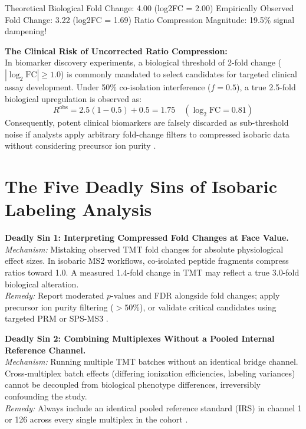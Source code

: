 \documentclass[11pt,oneside]{book}
\begin{document}
\begin{routput}
Theoretical Biological Fold Change: 4.00 (log2FC = 2.00)
Empirically Observed Fold Change:   3.22 (log2FC = 1.69)
Ratio Compression Magnitude:       19.5\% signal dampening!
\end{routput}

\begin{biologicalinsight}
\textbf{The Clinical Risk of Uncorrected Ratio Compression:}\\
In biomarker discovery experiments, a biological threshold of 2-fold change ($|\log_2\text{FC}| \ge 1.0$) is commonly mandated to select candidates for targeted clinical assay development. Under 50\% co-isolation interference ($f = 0.5$), a true 2.5-fold biological upregulation is observed as:
$$R^{\text{obs}} = 2.5(1 - 0.5) + 0.5 = 1.75 \quad (\log_2\text{FC} = 0.81)$$
Consequently, potent clinical biomarkers are falsely discarded as sub-threshold noise if analysts apply arbitrary fold-change filters to compressed isobaric data without considering precursor ion purity \cite{ting2011sps}.
\end{biologicalinsight}

\section{The Five Deadly Sins of Isobaric Labeling Analysis}

\begin{pitfallbox}
\textbf{Deadly Sin 1: Interpreting Compressed Fold Changes at Face Value.}\\
\textit{Mechanism:} Mistaking observed TMT fold changes for absolute physiological effect sizes. In isobaric MS2 workflows, co-isolated peptide fragments compress ratios toward 1.0. A measured 1.4-fold change in TMT may reflect a true 3.0-fold biological alteration.\\
\textit{Remedy:} Report moderated $p$-values and FDR alongside fold changes; apply precursor ion purity filtering ($>50\%$), or validate critical candidates using targeted PRM or SPS-MS3 \cite{ting2011sps, brennan2019faims}.
\end{pitfallbox}

\begin{pitfallbox}
\textbf{Deadly Sin 2: Combining Multiplexes Without a Pooled Internal Reference Channel.}\\
\textit{Mechanism:} Running multiple TMT batches without an identical bridge channel. Cross-multiplex batch effects (differing ionization efficiencies, labeling variances) cannot be decoupled from biological phenotype differences, irreversibly confounding the study.\\
\textit{Remedy:} Always include an identical pooled reference standard (IRS) in channel 1 or 126 across every single multiplex in the cohort \cite{plubell2017extended, huang2020msstatstmt}.
\end{pitfallbox}
\end{document}
